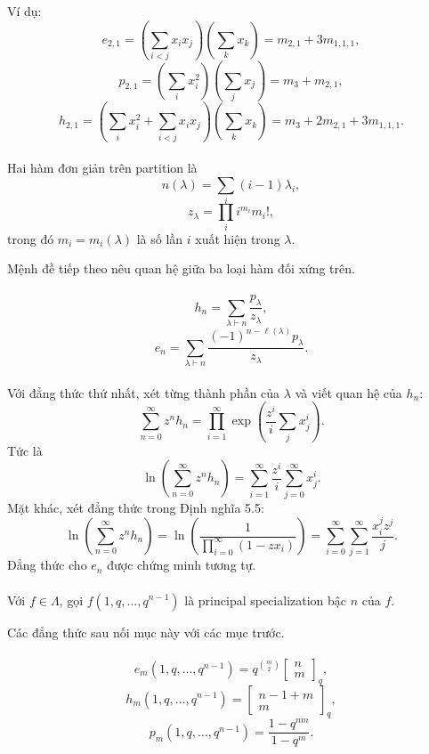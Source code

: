 \documentclass[11pt]{article}
\begin{document}
Ví dụ:
\[
  e_{2,1}
  =
  \left(\sum_{i<j}x_ix_j\right)\left(\sum_kx_k\right)
  =
  m_{2,1}+3m_{1,1,1},
\]
\[
  p_{2,1}
  =
  \left(\sum_i x_i^2\right)\left(\sum_jx_j\right)
  =
  m_3+m_{2,1},
\]
\[
  h_{2,1}
  =
  \left(\sum_i x_i^2+\sum_{i<j}x_ix_j\right)
  \left(\sum_kx_k\right)
  =
  m_3+2m_{2,1}+3m_{1,1,1}.
\]

\paragraph{}
Hai hàm đơn giản trên partition là
\[
  n(\lambda)=\sum_i(i-1)\lambda_i,
\]
\[
  z_\lambda=\prod_i i^{m_i}m_i!,
\]
trong đó \(m_i=m_i(\lambda)\) là số lần \(i\) xuất hiện trong \(\lambda\).

Mệnh đề tiếp theo nêu quan hệ giữa ba loại hàm đối xứng trên.

\paragraph{}
\[
  h_n=\sum_{\lambda\vdash n}\frac{p_\lambda}{z_\lambda},
\]
\[
  e_n=\sum_{\lambda\vdash n}
  \frac{(-1)^{n-\ell(\lambda)}p_\lambda}{z_\lambda}.
\]

\paragraph{}
Với đẳng thức thứ nhất, xét từng thành phần của \(\lambda\) và viết quan hệ
của \(h_n\):
\[
  \sum_{n=0}^{\infty}z^nh_n
  =
  \prod_{i=1}^{\infty}\exp\left(\frac{z^i}{i}\sum_jx_j^i\right).
\]
Tức là
\[
  \ln\left(\sum_{n=0}^{\infty}z^nh_n\right)
  =
  \sum_{i=1}^{\infty}\frac{z^i}{i}\sum_{j=0}^{\infty}x_j^i.
\]
Mặt khác, xét đẳng thức trong Định nghĩa 5.5:
\[
  \ln\left(\sum_{n=0}^{\infty}z^nh_n\right)
  =
  \ln\left(\frac{1}{\prod_{i=0}^{\infty}(1-zx_i)}\right)
  =
  \sum_{i=0}^{\infty}\sum_{j=1}^{\infty}\frac{x_i^jz^j}{j}.
\]
Đẳng thức cho \(e_n\) được chứng minh tương tự.

\paragraph{}
Với \(f\in\Lambda\), gọi \(f(1,q,\ldots,q^{n-1})\) là principal
specialization bậc \(n\) của \(f\).

Các đẳng thức sau nối mục này với các mục trước.

\paragraph{}
\[
  e_m(1,q,\ldots,q^{n-1})
  =
  q^{\binom{m}{2}}
  \left[\begin{matrix}n\\ m\end{matrix}\right]_q,
\]
\[
  h_m(1,q,\ldots,q^{n-1})
  =
  \left[\begin{matrix}n-1+m\\ m\end{matrix}\right]_q,
\]
\[
  p_m(1,q,\ldots,q^{n-1})
  =
  \frac{1-q^{nm}}{1-q^m}.
\]
\end{document}

